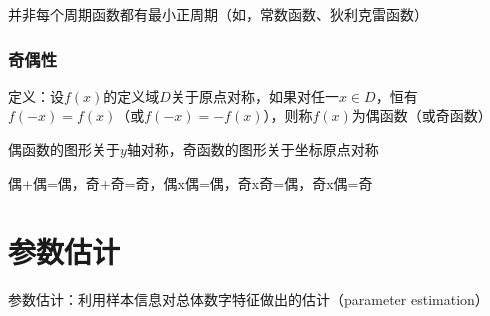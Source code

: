 \documentclass[12pt]{book}
\begin{document}
并非每个周期函数都有最小正周期（如，常数函数、狄利克雷函数）

\subsection{奇偶性}

定义：设$f(x)$的定义域$D$关于原点对称，如果对任一$x\in D$，恒有$f(-x)=f(x)$（或$ f(-x)=- f(x)$），则称$f(x)$为偶函数（或奇函数）


偶函数的图形关于$y$轴对称，奇函数的图形关于坐标原点对称

偶+偶=偶，奇+奇=奇，偶x偶=偶，奇x奇=偶，奇x偶=奇







\chapter{参数估计}

参数估计：利用样本信息对总体数字特征做出的估计（parameter estimation）
\\
\end{document}

